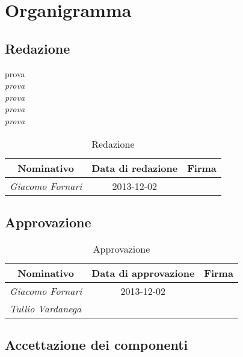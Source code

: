 \section{Organigramma}

	\subsection{Redazione}
	
	prova \\
	\emph{\emph{prova}} \\
	\textit{prova} \\
	\textit{\textit{prova}} \\
	\emph{\textit{prova}} \\
	
	\def\arraystretch{2}
	\begin{table}[h]
	\centering
	\begin{tabular}{ l c l }
	\hline
	\multicolumn{1}{c}{\textbf{Nominativo}} & \multicolumn{1}{c}{\textbf{Data di redazione}} & \multicolumn{1}{c}{\textbf{Firma}} \\
	\hline
	\textit{Giacomo Fornari} & 2013-12-02 & \hspace{5cm} \\
	\hline
	\end{tabular}
	\caption{Redazione}
	\end{table}
		
	\subsection{Approvazione}
	
	\begin{table}[h]
	\centering
	\begin{tabular}{ l c l }
	\hline
	\multicolumn{1}{c}{\textbf{Nominativo}} & \multicolumn{1}{c}{\textbf{Data di approvazione}} & \multicolumn{1}{c}{\textbf{Firma}} \\
	\hline
	\textit{Giacomo Fornari} & 2013-12-02 & \hspace{5cm} \\
	\textit{Tullio Vardanega} &  & \hspace{5cm} \\
	\hline
	\end{tabular}
	\caption{Approvazione}
	\end{table}
	
	\subsection{Accettazione dei componenti}
	
